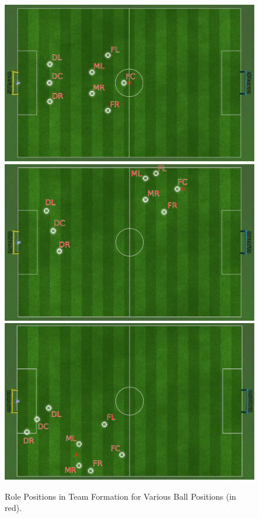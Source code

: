 \begin{figure}[t!]
\centering
  \includegraphics[height=0.3\textheight]{Chapter4/figures/Formation(0,0).pdf}\\
  \includegraphics[height=0.3\textheight]{Chapter4/figures/Formation(5,5).pdf}\\
  \includegraphics[height=0.3\textheight]{Chapter4/figures/Formation(-5,-5).pdf}\\
  \caption{Role Positions in Team Formation for Various Ball Positions (in red).} 
  \label{fig:FormationExamples}
\end{figure}

